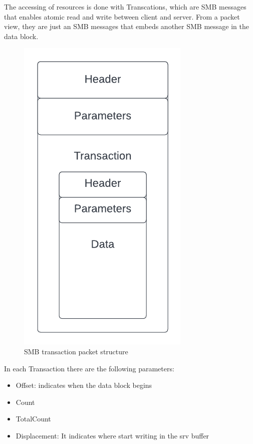 The accessing of resources is done with Transcations, which are SMB messages that enables atomic read and write
between client and server.
From a packet view, they are just an SMB messages that embeds another SMB message in the data block.
\begin{figure}[ht!]
    \centering
      \includegraphics[scale=0.5]{images/smb_trans_structure.png}
      \caption{SMB transaction packet structure}
\end{figure}

In each Transaction there are the following parameters:
\begin{itemize}
    \item Offset: indicates when the data block begins
    \item Count
    \item TotalCount
    \item Displacement: It indicates where start writing in the srv buffer
\end{itemize}

